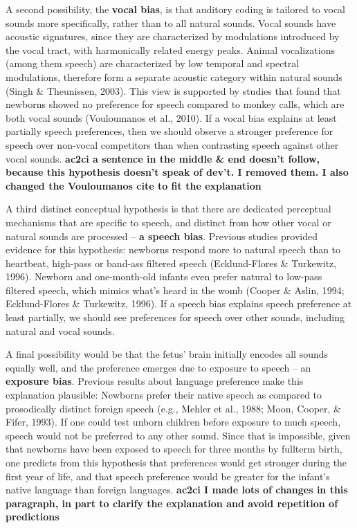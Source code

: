 \documentclass[
  english,
  man]{apa6}
\begin{document}
A second possibility, the \textbf{vocal bias}, is that auditory coding is tailored to vocal sounds more specifically, rather than to all natural sounds. Vocal sounds have acoustic signatures, since they are characterized by modulations introduced by the vocal tract, with harmonically related energy peaks. Animal vocalizations (among them speech) are characterized by low temporal and spectral modulations, therefore form a separate acoustic category within natural sounds (Singh \& Theunissen, 2003). This view is supported by studies that found that newborns showed no preference for speech compared to monkey calls, which are both vocal sounds (Vouloumanos et al., 2010). If a vocal bias explains at least partially speech preferences, then we should observe a stronger preference for speech over non-vocal competitors than when contrasting speech against other vocal sounds.
\textbf{ac2ci a sentence in the middle \& end doesn't follow, because this hypothesis doesn't speak of dev't. I removed them. I also changed the Vouloumanos cite to fit the explanation}

A third distinct conceptual hypothesis is that there are dedicated perceptual mechanisms that are specific to speech, and distinct from how other vocal or natural sounds are processed -- \textbf{a speech bias}. Previous studies provided evidence for this hypothesis: newborns respond more to natural speech than to heartbeat, high-pass or band-ass filtered speech (Ecklund-Flores \& Turkewitz, 1996). Newborn and one-month-old infants even prefer natural to low-pass filtered speech, which mimics what's heard in the womb (Cooper \& Aslin, 1994; Ecklund-Flores \& Turkewitz, 1996). If a speech bias explains speech preference at least partially, we should see preferences for speech over other sounds, including natural and vocal sounds.

A final possibility would be that the fetus' brain initially encodes all sounds equally well, and the preference emerges due to exposure to speech -- an \textbf{exposure bias}. Previous results about language preference make this explanation plausible: Newborns prefer their native speech as compared to prosodically distinct foreign speech (e.g., Mehler et al., 1988; Moon, Cooper, \& Fifer, 1993). If one could test unborn children before exposure to much speech, speech would not be preferred to any other sound. Since that is impossible, given that newborns have been exposed to speech for three months by fullterm birth, one predicts from this hypothesis that preferences would get stronger during the first year of life, and that speech preference would be greater for the infant's native language than foreign languages.
\textbf{ac2ci I made lots of changes in this paragraph, in part to clarify the explanation and avoid repetition of predictions}
\end{document}
